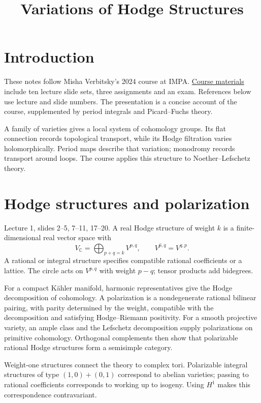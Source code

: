 

\title{Variations of Hodge Structures}
\maketitle
\tableofcontents

\section{Introduction}
\label{section-introduction}

These notes follow Misha Verbitsky's
2024 course at IMPA.
\href{http://verbit.ru/IMPA/VHS-2024/}
{Course materials} include ten lecture
slide sets, three assignments and an exam.
References below use lecture and slide
numbers. The presentation is a concise
account of the course, supplemented by
period integrals and Picard--Fuchs theory.

A family of varieties gives a local system
of cohomology groups. Its flat connection
records topological transport, while its
Hodge filtration varies holomorphically.
Period maps describe that variation;
monodromy records transport around loops.
The course applies this structure to
Noether--Lefschetz theory.

\section{Hodge structures and polarization}
\label{section-hodge-structures}

Lecture 1, slides 2--5, 7--11, 17--20.
A real Hodge structure of weight $k$ is a
finite-dimensional real vector space with
$$
V_{\mathbb C}=\bigoplus_{p+q=k}V^{p,q},
\qquad
\overline{V^{p,q}}=V^{q,p}.
$$
A rational or integral structure specifies
compatible rational coefficients or a
lattice. The circle acts on $V^{p,q}$
with weight $p-q$; tensor products add
bidegrees.

For a compact K\"ahler manifold, harmonic
representatives give the Hodge decomposition
of cohomology. A polarization is a
nondegenerate rational bilinear pairing,
with parity determined by the weight,
compatible with the decomposition and
satisfying Hodge--Riemann positivity.
For a smooth projective variety, an ample
class and the Lefschetz decomposition
supply polarizations on primitive
cohomology. Orthogonal complements then
show that polarizable rational Hodge
structures form a semisimple category.

Weight-one structures connect the theory
to complex tori. Polarizable integral
structures of type $(1,0)+(0,1)$ correspond
to abelian varieties; passing to rational
coefficients corresponds to working up to
isogeny. Using $H^1$ makes this
correspondence contravariant.


